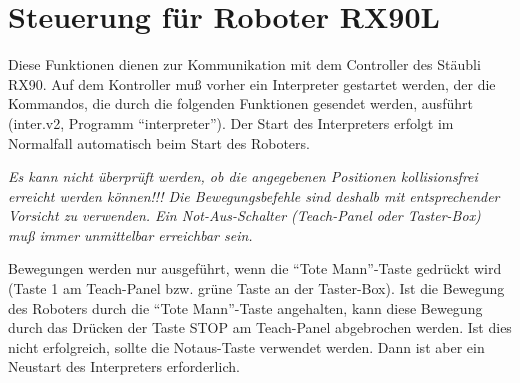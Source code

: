 \section{Steuerung für Roboter RX90L}
\label{RoboterSteuerung}

Diese Funktionen dienen zur Kommunikation mit dem Controller des Stäubli
RX90. Auf dem Kontroller muß vorher ein Interpreter gestartet werden, der die
Kommandos, die durch die folgenden Funktionen gesendet werden, ausführt
(inter.v2, Programm ``interpreter''). Der Start des Interpreters erfolgt
im Normalfall automatisch beim Start des Roboters.

{\em Es kann nicht überprüft werden, ob die angegebenen Positionen
kollisionsfrei erreicht werden können!!! Die Bewegungsbefehle sind deshalb mit
entsprechender Vorsicht zu verwenden. Ein Not-Aus-Schalter (Teach-Panel oder
Taster-Box) muß immer unmittelbar erreichbar sein.}

Bewegungen werden nur ausgeführt, wenn die ``Tote Mann''-Taste gedrückt
wird (Taste 1 am Teach-Panel bzw. grüne Taste an der Taster-Box). Ist 
die Bewegung des Roboters durch die ``Tote Mann''-Taste angehalten, kann 
diese Bewegung durch das Drücken der Taste STOP am Teach-Panel abgebrochen 
werden. Ist dies nicht erfolgreich, sollte die Notaus-Taste verwendet 
werden. Dann ist aber ein Neustart des Interpreters erforderlich.

